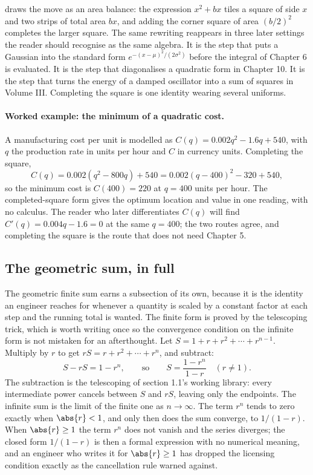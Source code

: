 

 draws the move as an area
balance: the expression $x^{2} + bx$ tiles a square of side $x$ and
two strips of total area $bx$, and adding the corner square of area
$(b/2)^{2}$ completes the larger square. The same rewriting reappears
in three later settings the reader should recognise as the same
algebra. It is the step that puts a Gaussian into the standard form
$e^{-(x - \mu)^{2}/(2\sigma^{2})}$ before the integral of Chapter 6 is
evaluated. It is the step that diagonalises a quadratic form in
Chapter 10. It is the step that turns the energy of a damped
oscillator into a sum of squares in Volume III. Completing the square
is one identity wearing several uniforms.

\paragraph{Worked example: the minimum of a quadratic cost.}
A manufacturing cost per unit is modelled as $C(q) = 0.002 q^{2} - 1.6
q + 540$, with $q$ the production rate in units per hour and $C$ in
currency units. Completing the square,
\[
C(q) = 0.002\left(q^{2} - 800 q\right) + 540
= 0.002\left(q - 400\right)^{2} - 320 + 540,
\]
so the minimum cost is $C(400) = 220$ at $q = 400$ units per hour. The
completed-square form gives the optimum location and value in one
reading, with no calculus. The reader who later differentiates
$C(q)$ will find $C'(q) = 0.004 q - 1.6 = 0$ at the same $q = 400$;
the two routes agree, and completing the square is the route that does
not need Chapter 5.

\subsection{The geometric sum, in full}

The geometric finite sum earns a subsection of its own, because it is
the identity an engineer reaches for whenever a quantity is scaled by a
constant factor at each step and the running total is wanted. The finite
form is proved by the telescoping trick, which is worth writing once so
the convergence condition on the infinite form is not mistaken for an
afterthought. Let $S = 1 + r + r^{2} + \cdots + r^{n-1}$. Multiply by
$r$ to get $rS = r + r^{2} + \cdots + r^{n}$, and subtract:
\[
S - rS = 1 - r^{n},
\qquad\text{so}\qquad
S = \frac{1 - r^{n}}{1 - r}
\quad (r \neq 1).
\]
The subtraction is the telescoping of section 1.1's working library:
every intermediate power cancels between $S$ and $rS$, leaving only the
endpoints. The infinite sum is the limit of the finite one as $n \to
\infty$. The term $r^{n}$ tends to zero exactly when $\abs{r} < 1$, and
only then does the sum converge, to $1/(1 - r)$. When $\abs{r} \geq 1$
the term $r^{n}$ does not vanish and the series diverges; the closed
form $1/(1 - r)$ is then a formal expression with no numerical meaning,
and an engineer who writes it for $\abs{r} \geq 1$ has dropped the
licensing condition exactly as the cancellation rule warned against.


